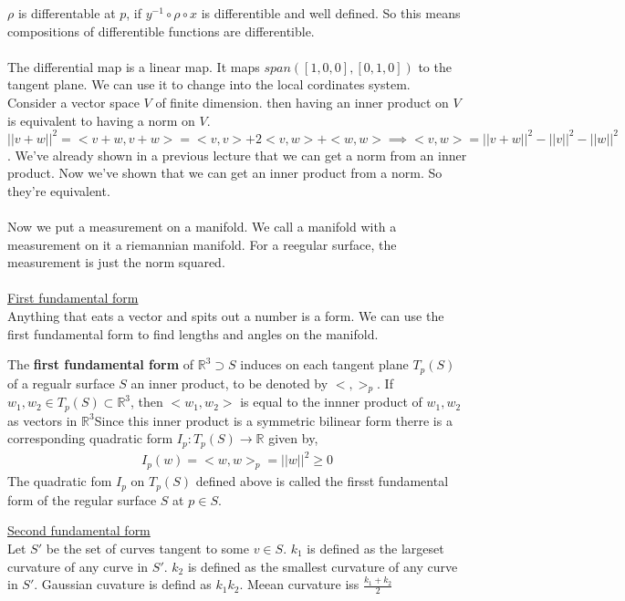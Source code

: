 \documentclass[12pt,letterpaper]{hmcpset}
\begin{document}
$\rho$ is differentable at $p$, if $y^{-1} \circ \rho \circ x$ is differentible and well
defined. So this means compositions of differentible functions are differentible.\\\\

The differential map is a linear map. It maps $span([1, 0, 0], [0, 1, 0])$ to
the tangent plane. We can use it to change into the local cordinates system. \\

Consider a vector space $V$ of finite dimension. then having an inner product on
$V$ is equivalent to having a norm on $V$. $||v + w||^2 = <v+w, v+w> = <v, v> +
2<v, w> + <w, w> \implies <v, w> = ||v+w||^2 - ||v||^2 - ||w||^2$.
We've already shown in a previous lecture that we can get a norm from an inner
product. Now we've shown that we can get an inner product from a norm. So
they're equivalent. \\\\

Now we put a measurement on a manifold. We call a manifold with a measurement on
it a riemannian manifold. For a reegular surface, the measurement is just the
norm squared. \\\\

\underline{First fundamental form} \\
Anything that eats a vector and spits out a number is a form.
We can use the first fundamental form to find lengths and angles on the
manifold.

The \textbf{first fundamental form}  of $\mathbb{R}^3 \supset S$ induces on each
tangent plane $T_p(S)$ of a regualr surface $S$ an inner product, to be denoted
by $< , >_p$. If $w_1, w_2 \in T_p(S) \subset \mathbb{R}^3$, then $<w_1, w_2>$ is equal
to the innner product of $w_1, w_2$ as vectors in $\mathbb{R}^3$Since this inner
product is a symmetric bilinear form therre is a corresponding quadratic form
$I_p: T_p(S) \rightarrow \mathbb{R}$ given by,
\begin{align*}
  I_p(w) = <w, w>_p = ||w||^2 \geq 0
\end{align*}
The quadratic fom $I_p$ on $T_p(S)$ defined above is called the firsst
fundamental form of the regular surface $S$ at $p \in S$. 

\underline{Second fundamental form} \\
Let $S'$ be the set of curves tangent to some $v \in S$.  $k_1$ is defined as the
largeset curvature of any curve in $S'$. $k_2$ is defined as the smallest
curvature of any curve in $S'$.
Gaussian cuvature is defind as $k_1k_2$. Meean curvature iss $\frac{k_1 + k_2}{2}$
\end{document}
